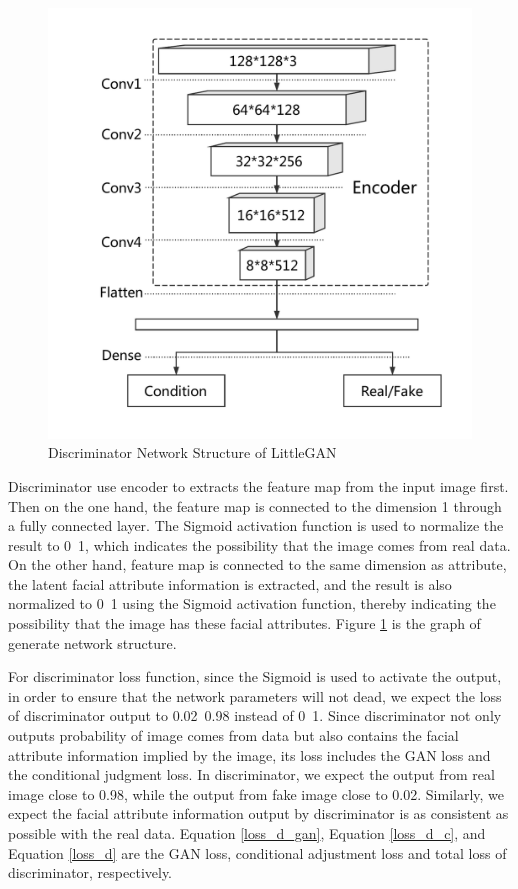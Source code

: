 \begin{figure}
\begin{minipage}[t]{0.48\linewidth}
        \includegraphics[width=\textwidth]{figures/net_discriminator.pdf}
        \caption{Discriminator Network Structure of LittleGAN}
        \label{net_discriminator}
    \end{minipage}
\end{figure}

Discriminator use encoder to extracts the feature map from the input image first.
Then on the one hand, the feature map is connected to the dimension 1 through a fully connected layer.
The Sigmoid activation function is used to normalize the result to 0~1,
    which indicates the possibility that the image comes from real data.
On the other hand, feature map is connected to the same dimension as attribute,
    the latent facial attribute information is extracted,
    and the result is also normalized to 0~1 using the Sigmoid activation function,
    thereby indicating the possibility that the image has these facial attributes.
Figure \ref{net_discriminator} is the graph of generate network structure.


For discriminator loss function, since the Sigmoid is used to activate the output,
    in order to ensure that the network parameters will not dead,
    we expect the loss of discriminator output to 0.02~0.98 instead of 0~1.
Since discriminator not only outputs probability of image comes from data but also contains the facial attribute information implied by the image,
    its loss includes the GAN loss and the conditional judgment loss.
In discriminator, we expect the output from real image close to 0.98, while the output from fake image close to 0.02.
Similarly, we expect the facial attribute information output by discriminator is as consistent as possible with the real data.
Equation \eqref{loss_d_gan}, Equation \eqref{loss_d_c}, and Equation \eqref{loss_d} are the GAN loss,
    conditional adjustment loss and total loss of discriminator, respectively.

